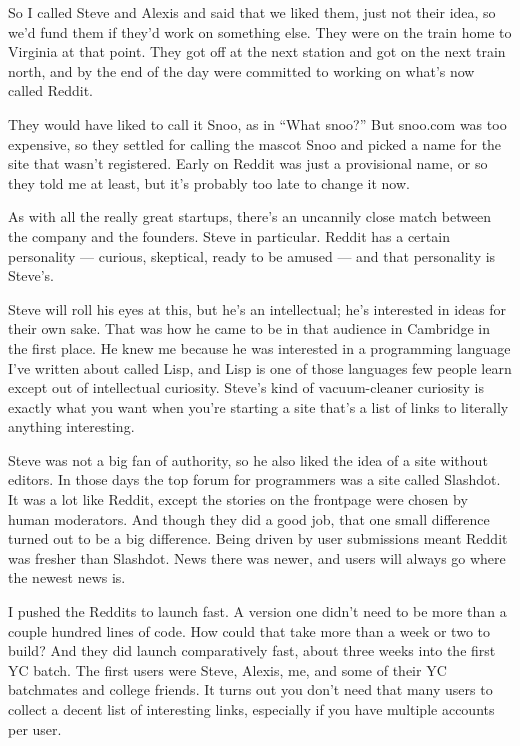 So I called Steve and Alexis and said that we liked them, just not their
idea, so we'd fund them if they'd work on something else. They were on
the train home to Virginia at that point. They got off at the next
station and got on the next train north, and by the end of the day were
committed to working on what's now called Reddit.

They would have liked to call it Snoo, as in ``What snoo?'' But snoo.com
was too expensive, so they settled for calling the mascot Snoo and
picked a name for the site that wasn't registered. Early on Reddit was
just a provisional name, or so they told me at least, but it's probably
too late to change it now.

As with all the really great startups, there's an uncannily close match
between the company and the founders. Steve in particular. Reddit has a
certain personality --- curious, skeptical, ready to be amused --- and
that personality is Steve's.

Steve will roll his eyes at this, but he's an intellectual; he's
interested in ideas for their own sake. That was how he came to be in
that audience in Cambridge in the first place. He knew me because he was
interested in a programming language I've written about called Lisp, and
Lisp is one of those languages few people learn except out of
intellectual curiosity. Steve's kind of vacuum-cleaner curiosity is
exactly what you want when you're starting a site that's a list of links
to literally anything interesting.

Steve was not a big fan of authority, so he also liked the idea of a
site without editors. In those days the top forum for programmers was a
site called Slashdot. It was a lot like Reddit, except the stories on
the frontpage were chosen by human moderators. And though they did a
good job, that one small difference turned out to be a big difference.
Being driven by user submissions meant Reddit was fresher than Slashdot.
News there was newer, and users will always go where the newest news is.

I pushed the Reddits to launch fast. A version one didn't need to be
more than a couple hundred lines of code. How could that take more than
a week or two to build? And they did launch comparatively fast, about
three weeks into the first YC batch. The first users were Steve, Alexis,
me, and some of their YC batchmates and college friends. It turns out
you don't need that many users to collect a decent list of interesting
links, especially if you have multiple accounts per user.

